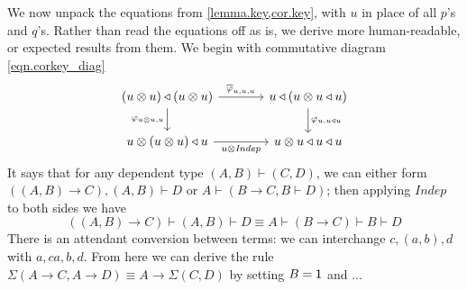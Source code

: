 \documentclass[11pt, one side, article]{memoir}
\theoremstyle{definition}
\theoremstyle{plain}
\newcommand{\Cat}[1]{\mathbf{#1}}%
\newcommand{\Fun}[1]{\mathit{#1}}%
\newcommand{\ol}[1]{\overline{#1}}
\newcommand{\poly}{\Cat{Poly}}
\newcommand{\polycart}{\poly^{\Cat{Cart}}}
\newcommand{\0}{\textsf{0}}
\newcommand{\1}{\tn{\textsf{1}}}
\newcommand{\tri}{\mathbin{\triangleleft}}
\newcommand{\indep}{\Fun{Indep}}
\begin{document}
We now unpack the equations from \cref{lemma.key,cor.key}, with $u$ in place of all $p$'s and $q$'s. Rather than read the equations off as is, we derive more human-readable, or expected results from them. We begin with commutative diagram \eqref{eqn.corkey_diag}
\[
\begin{tikzcd}[column sep=large]
	(u\otimes u)\tri(u\otimes u)\ar[r, "\ol\varphi_{u,u,u}"]\ar[d, "\varphi_{u\otimes u,u}"']&
	u\tri(u\otimes u\tri u)\ar[d, "\varphi_{u,u\tri u}"]\\
	u\otimes(u\otimes u)\tri u\ar[r, "u\otimes\indep"']&
	u\otimes u\tri u\tri u
\end{tikzcd}
\]
It says that for any dependent type $(A,B)\vdash(C,D)$, we can either form $((A,B)\to C),(A,B)\vdash D$ or $A\vdash (B\to C, B\vdash D)$; then applying $\indep$ to both sides we have
\[
((A,B)\to C)\vdash (A,B)\vdash D\equiv A\vdash (B\to C)\vdash B\vdash D
\]
There is an attendant conversion between terms: we can interchange $c,(a,b),d$ with $a,ca,b,d$. From here we can derive the rule $\Sigma(A\to C,A\to D)\equiv A\to\Sigma(C,D)$ by setting $B=\1$ and ...




%		










\printbibliography
\end{document}
